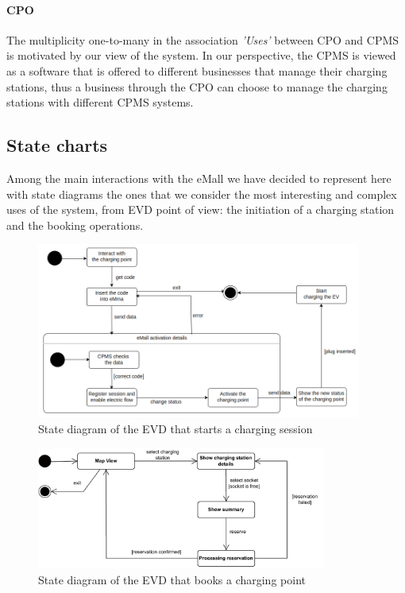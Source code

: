 \paragraph{CPO} The multiplicity one-to-many in the association \textit{'Uses'} between CPO and CPMS is motivated by our view of the system. In our perspective, the CPMS is viewed as a software that is offered to different businesses that manage their charging stations, thus a business through the CPO can choose to manage the charging stations with different CPMS systems.

\subsection{State charts}
Among the main interactions with the eMall we have decided to represent here with state diagrams the ones that we consider the most interesting and complex uses of the system, from EVD point of view: the initiation of a charging station and the booking operations.

\begin{figure}[H]
    \centering
    \includegraphics[width=0.95\textwidth]{Images/ChargingNow.png}
    \caption{State diagram of the EVD that starts a charging session}
\end{figure}

\begin{figure}[H]
    \centering
    \includegraphics[width=0.85\textwidth]{Images/booking_charge_state_diag}
    \caption{State diagram of the EVD that books a charging point}
\end{figure}

